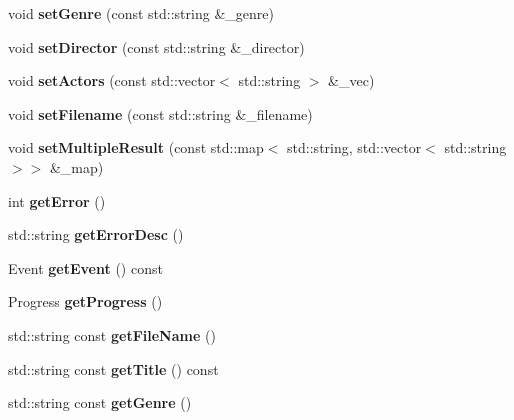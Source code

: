 \begin{DoxyCompactItemize}
void {\bfseries set\+Genre} (const std\+::string \&\+\_\+genre)
\item 
\mbox{\label{classRequest_af90380270fe528914cd2d7bee34bd987}} 
void {\bfseries set\+Director} (const std\+::string \&\+\_\+director)
\item 
\mbox{\label{classRequest_aab34f8677063f837ad8cca8dda75393a}} 
void {\bfseries set\+Actors} (const std\+::vector$<$ std\+::string $>$ \&\+\_\+vec)
\item 
\mbox{\label{classRequest_aa18562802f571d76ce3296b3001ffe15}} 
void {\bfseries set\+Filename} (const std\+::string \&\+\_\+filename)
\item 
\mbox{\label{classRequest_aec880c38436e60224fd02512a9ea3fb7}} 
void {\bfseries set\+Multiple\+Result} (const std\+::map$<$ std\+::string, std\+::vector$<$ std\+::string $>$$>$ \&\+\_\+map)
\item 
\mbox{\label{classRequest_afba4fd36f889aec3625a45b7227d318a}} 
int {\bfseries get\+Error} ()
\item 
\mbox{\label{classRequest_abc555029e5f0bf69bcad19075e444327}} 
std\+::string {\bfseries get\+Error\+Desc} ()
\item 
\mbox{\label{classRequest_aa32770806b75e24aa283b306f3e47552}} 
Event {\bfseries get\+Event} () const
\item 
\mbox{\label{classRequest_ab7046df0d75e35e686f085ddbdebd8f0}} 
Progress {\bfseries get\+Progress} ()
\item 
\mbox{\label{classRequest_afa4d474657bb1b20a165026317b55018}} 
std\+::string const {\bfseries get\+File\+Name} ()
\item 
\mbox{\label{classRequest_a23ed3e91b2a44f5d77404d0c952886d6}} 
std\+::string const {\bfseries get\+Title} () const
\item 
\mbox{\label{classRequest_a84dfb549a607e1eb8639b1d883dd00d0}} 
std\+::string const {\bfseries get\+Genre} ()
\item 
$$
\end{DoxyCompactItemize}
